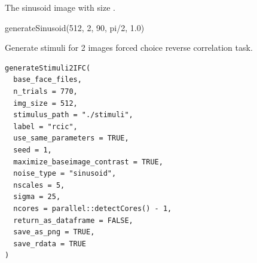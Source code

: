\documentclass[letterpaper]{book}
\begin{document}
%
\begin{Value}
The sinusoid image with size .
\end{Value}
%
\begin{Examples}
\begin{ExampleCode}
generateSinusoid(512, 2, 90, pi/2, 1.0)
\end{ExampleCode}
\end{Examples}
%
\begin{Description}
Generate stimuli for 2 images forced choice reverse correlation task.
\end{Description}
%
\begin{Usage}
\begin{verbatim}
generateStimuli2IFC(
  base_face_files,
  n_trials = 770,
  img_size = 512,
  stimulus_path = "./stimuli",
  label = "rcic",
  use_same_parameters = TRUE,
  seed = 1,
  maximize_baseimage_contrast = TRUE,
  noise_type = "sinusoid",
  nscales = 5,
  sigma = 25,
  ncores = parallel::detectCores() - 1,
  return_as_dataframe = FALSE,
  save_as_png = TRUE,
  save_rdata = TRUE
)
\end{verbatim}
\end{Usage}
%
\end{document}
